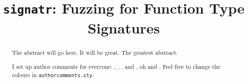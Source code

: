 \documentclass[sigconf,review, anonymous]{acmart}
\begin{document}
\title{{\tt signatr}: Fuzzing for Function Type Signatures}

\begin{abstract}
The abstract will go here.
It will be great.
The greatest abstract.

I set up author comments for everyone: , , , and , oh and .
Feel free to change the colours in {\tt authorcomments.sty}.
\end{abstract}

\maketitle








\end{document}
